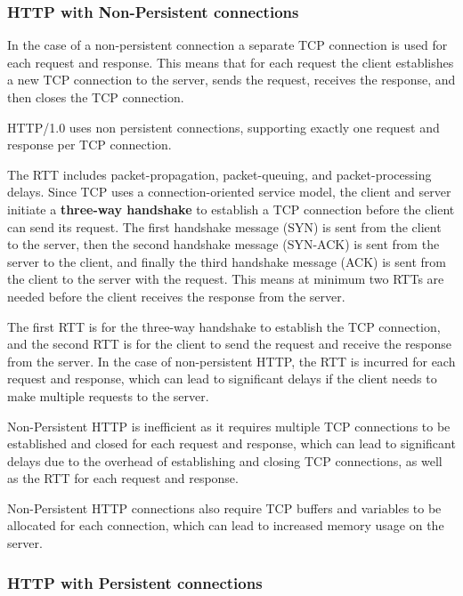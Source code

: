 \documentclass[12pt letter]{report}
\begin{document}
\subsubsection{HTTP with Non-Persistent connections}

In the case of a non-persistent connection a separate TCP connection
is used for each request and response. This means that for each
request the client
establishes a new TCP connection to the server, sends the request,
receives the response, and then closes the TCP connection.

HTTP/1.0 uses non persistent connections, supporting exactly one
request and response per TCP connection.


The RTT includes packet-propagation, packet-queuing, and
packet-processing delays. Since TCP uses a connection-oriented
service model, the client and server initiate a \textbf{three-way
handshake} to establish a TCP connection before the client can send
its request. The first handshake message (SYN) is sent from the
client to the server, then the second handshake message (SYN-ACK) is
sent from the server to the client, and finally the third handshake
message (ACK) is sent from the client to the server with the request.
This means at minimum two RTTs are needed before the client receives
the response from the server.

The first RTT is for the three-way handshake to establish the TCP
connection, and the second RTT is for the client to send the request
and receive the response from the server. In the case of
non-persistent HTTP, the RTT is incurred for each request and
response, which can lead to significant delays if the client needs to
make multiple requests to the server.

Non-Persistent HTTP is inefficient as it requires multiple TCP
connections to be established and closed for each request and
response, which can lead to significant delays due to the overhead of
establishing and closing TCP connections, as well as the RTT for each
request and response.

Non-Persistent HTTP connections also require TCP buffers and
variables to be allocated for each connection, which can lead to
increased memory usage on the server.

\subsubsection{HTTP with Persistent connections}
\end{document}

